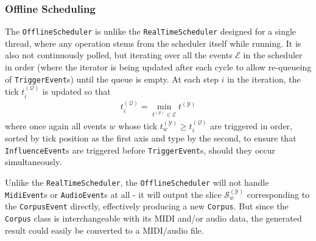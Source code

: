 \subsubsection{Offline Scheduling}\label{sec:4-generator-evaluator-offline}
The \texttt{OfflineScheduler} is unlike the \texttt{RealTimeScheduler} designed for a single thread, where any operation stems from the scheduler itself while running. It is also not continuously polled, but iterating over all the events $\mathcal E$ in the scheduler in order (where the iterator is being updated after each cycle to allow re-queueing of \texttt{TriggerEvent}s) until the queue is empty. At each step $i$ in the iteration, the tick $t^{(\mathcal Q)}_i$ is updated so that
\begin{align}
	t^{(\mathcal Q)}_i = \operatorname*{min}_{t^{(\mathcal Y)} \in \mathcal E} t^{(\mathcal Y)}
\end{align}
where once again all events $w$ whose tick $t^{(\mathcal Y)}_w \ge t_i^{(\mathcal Q)}$ are triggered in order, sorted by tick position as the first axis and type by the second, to ensure that \texttt{InfluenceEvent}s are triggered before \texttt{TriggerEvent}s, should they occur simultaneously.

Unlike the \texttt{RealTimeScheduler}, the \texttt{OfflineScheduler} will not handle \texttt{Midi\-Event}s or \texttt{AudioEvent}s at all - it will output the slice $\mathcal S^{(\mathcal Y)}_w$ corresponding to the \texttt{CorpusEvent} directly, effectively producing a new \texttt{Corpus}. But since the \texttt{Corpus} class is interchangeable with its MIDI and/or audio data, the generated result could easily be converted to a MIDI/audio file.


